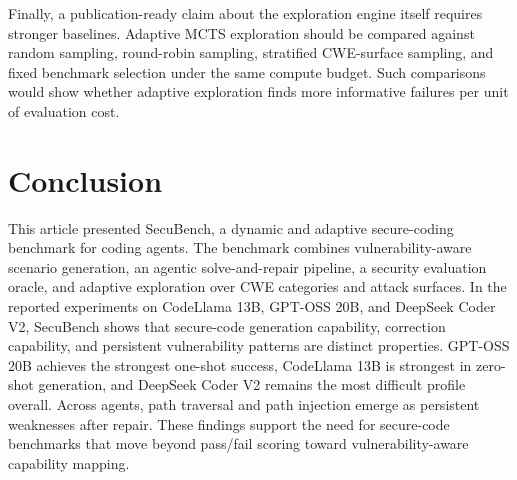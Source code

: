\documentclass[11pt]{article}
\newcommand{\toolname}{SecuBench}
\begin{document}
Finally, a publication-ready claim about the exploration engine itself requires stronger baselines. Adaptive MCTS exploration should be compared against random sampling, round-robin sampling, stratified CWE-surface sampling, and fixed benchmark selection under the same compute budget. Such comparisons would show whether adaptive exploration finds more informative failures per unit of evaluation cost.

\FloatBarrier
\section{Conclusion}

This article presented \toolname{}, a dynamic and adaptive secure-coding benchmark for coding agents. The benchmark combines vulnerability-aware scenario generation, an agentic solve-and-repair pipeline, a security evaluation oracle, and adaptive exploration over CWE categories and attack surfaces. In the reported experiments on CodeLlama 13B, GPT-OSS 20B, and DeepSeek Coder V2, \toolname{} shows that secure-code generation capability, correction capability, and persistent vulnerability patterns are distinct properties. GPT-OSS 20B achieves the strongest one-shot success, CodeLlama 13B is strongest in zero-shot generation, and DeepSeek Coder V2 remains the most difficult profile overall. Across agents, path traversal and path injection emerge as persistent weaknesses after repair. These findings support the need for secure-code benchmarks that move beyond pass/fail scoring toward vulnerability-aware capability mapping.
\end{document}
